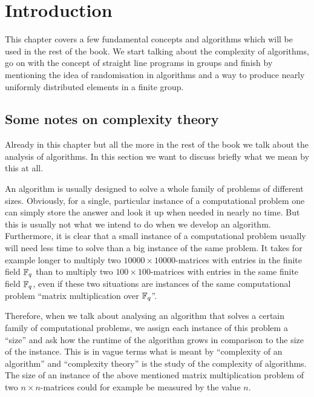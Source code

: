 
\chapter{Introduction}

This chapter covers a few fundamental concepts and algorithms which
will be used in the rest of the book. We start talking about the
complexity of algorithms, go on with the concept of straight line
programs in groups and finish by mentioning the idea of randomisation
in algorithms and a way to produce nearly uniformly distributed
elements in a finite group.

\section{Some notes on complexity theory}
\label{sec:complexity}

Already in this chapter but all the more in the rest of the book we
talk about the analysis of algorithms. In this section we want to
discuss briefly what we mean by this at all.

An algorithm is usually designed to solve a whole family of problems of
different sizes. Obviously, for a single, particular instance of a
computational problem one can simply store the answer and look it up
when needed in nearly no time. But this is usually not what we intend
to do when we develop an algorithm. Furthermore, it is clear that a
small instance of a computational problem usually will need less time
to solve than a big instance of the same problem. It takes for example longer 
to multiply two $10000\times 10000$-matrices with entries in the finite 
field $\mathbb{F}_q$ than to multiply two $100\times 100$-matrices
with entries in the same finite field $\mathbb{F}_q$,
even if these two situations are instances of the same
computational problem ``matrix multiplication over $\mathbb{F}_q$''.

Therefore, when we talk about analysing an algorithm that solves a
certain family of computational problems, we assign each instance of
this problem a ``size'' and ask how the runtime of the algorithm grows
in comparison to the size of the instance. This is in vague terms
what is meant by ``complexity of an algorithm'' and ``complexity
theory'' is the study of the complexity of algorithms. The size of an
instance of the above mentioned matrix multiplication problem of two $n
\times n$-matrices could for example be measured by the value $n$.


